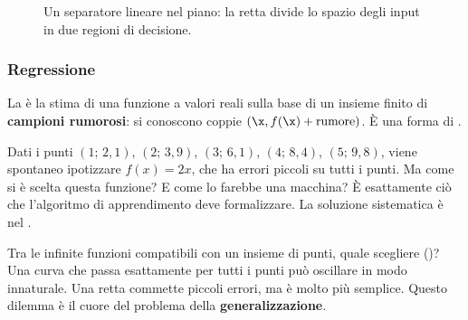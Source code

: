 \begin{figure}[ht]
\centering
{}
\caption{Un separatore lineare nel piano: la retta divide lo spazio degli input in due regioni di decisione.}
\label{fig:separatore}
\end{figure}

\subsubsection{Regressione}
La  è la stima di una funzione a valori reali sulla base di un insieme finito di
\textbf{campioni rumorosi}: si conoscono coppie $(\x, f(\x) + \text{rumore})$. È una forma di .

\begin{esempio}
Dati i punti $(1;\,2{,}1)$, $(2;\,3{,}9)$, $(3;\,6{,}1)$, $(4;\,8{,}4)$, $(5;\,9{,}8)$, viene spontaneo ipotizzare
$f(x) = 2x$, che ha errori piccoli su tutti i punti. Ma come si è scelta questa funzione? E come lo farebbe una
macchina? È esattamente ciò che l'algoritmo di apprendimento deve formalizzare. La soluzione sistematica è nel
.
\end{esempio}

Tra le infinite funzioni compatibili con un insieme di punti, quale scegliere ()? Una
curva che passa esattamente per tutti i punti può oscillare in modo innaturale. Una retta commette piccoli errori,
ma è molto più semplice. Questo dilemma è il cuore del problema della \textbf{generalizzazione}.

